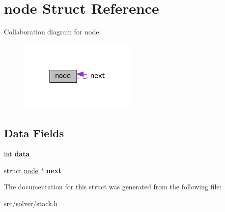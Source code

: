 \hypertarget{structnode}{}\section{node Struct Reference}
\label{structnode}


Collaboration diagram for node\+:
\nopagebreak
\begin{figure}[H]
\begin{center}
\leavevmode
\includegraphics[width=164pt]{structnode__coll__graph}
\end{center}
\end{figure}
\subsection*{Data Fields}
\begin{DoxyCompactItemize}
\item 
\mbox{\label{structnode_a9eab91667db4d35c7231dcddf7b89a76}} 
int {\bfseries data}
\item 
\mbox{\label{structnode_a0dc1b6470487aa86d9936e3cab8b95be}} 
struct \hyperlink{structnode}{node} $\ast$ {\bfseries next}
\end{DoxyCompactItemize}


The documentation for this struct was generated from the following file\+:\begin{DoxyCompactItemize}
\item 
src/solver/stack.\+h\end{DoxyCompactItemize}
